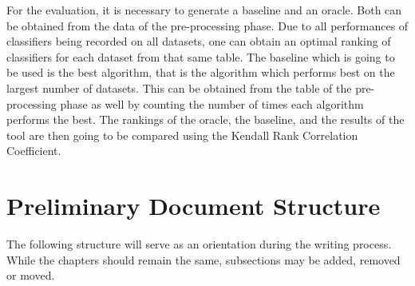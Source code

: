 \documentclass[12pt]{scrartcl}
\begin{document}
For the evaluation, it is necessary to generate a baseline and an oracle. Both can be obtained from the data of the pre-processing phase. Due to all performances of classifiers being recorded on all datasets, one can obtain an optimal ranking of classifiers for each dataset from that same table. The baseline which is going to be used is the best algorithm, that is the algorithm which performs best on the largest number of datasets. This can be obtained from the table of the pre-processing phase as well by counting the number of times each algorithm performs the best. The rankings of the oracle, the baseline, and the results of the tool are then going to be compared using the Kendall Rank Correlation Coefficient.


\newpage
\section{Preliminary Document Structure}\label{sec:doc-structure}
The following structure will serve as an orientation during the writing process. While the chapters should remain the same, subsections may be added, removed or moved.
\end{document}
